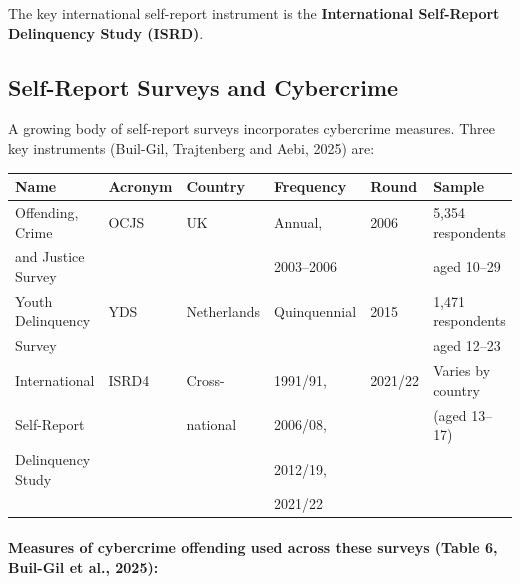 \documentclass[11pt,a4paper,openany]{report}
\theoremstyle{definition}
\theoremstyle{plain}
\theoremstyle{remark}
\begin{document}
The key international self-report instrument is the \textbf{International Self-Report Delinquency Study (ISRD)}.

\subsection{Self-Report Surveys and Cybercrime}

A growing body of self-report surveys incorporates cybercrime measures. Three key instruments (Buil-Gil, Trajtenberg and Aebi, 2025) are:

\begin{center}
\begin{tabular}{llllll}
\toprule
\textbf{Name} & \textbf{Acronym} & \textbf{Country} & \textbf{Frequency} & \textbf{Round} & \textbf{Sample} \\
\midrule
Offending, Crime & OCJS & UK & Annual, & 2006 & 5,354 respondents \\
and Justice Survey & & & 2003--2006 & & aged 10--29 \\
Youth Delinquency & YDS & Netherlands & Quinquennial & 2015 & 1,471 respondents \\
Survey & & & & & aged 12--23 \\
International & ISRD4 & Cross- & 1991/91, & 2021/22 & Varies by country \\
Self-Report & & national & 2006/08, & & (aged 13--17) \\
Delinquency Study & & & 2012/19, & & \\
 & & & 2021/22 & & \\
\bottomrule
\end{tabular}
\end{center}

\paragraph{Measures of cybercrime offending used across these surveys (Table 6, Buil-Gil et al., 2025):}
\end{document}
